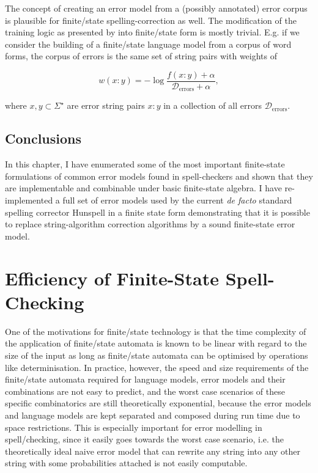 \documentclass[officiallayout,final]{unihelcompling}
\begin{document}
The concept of creating an error model from a (possibly annotated) error corpus
is plausible for finite\-/state spelling-correction as well. The modification
of the training logic as presented by \citet{church1991probability} into
finite\-/state form is mostly trivial. E.g. if we consider the building of a
finite\-/state language model from a corpus of word forms, the corpus of errors
is the same set of string pairs with weights of 

\begin{equation}
    w(x:y) = -\log\frac{f(x:y) + \alpha}{\mathcal{D}_\mathrm{errors} + \alpha},
\end{equation}

where $x, y \subset \Sigma^\star$ are error string pairs $x:y$ in a collection
of all errors $\mathcal{D}_\mathrm{errors}$.

\section{Conclusions}

In this chapter, I have enumerated some of the most important finite-state
formulations of common error models found in spell-checkers and shown that they
are implementable and combinable under basic finite-state algebra. I have
re-implemented a full set of error models used by the current \emph{de facto}
standard spelling corrector Hunspell in a finite state form demonstrating that
it is possible to replace string-algorithm correction algorithms by a sound
finite-state error model.

\chapter{Efficiency of Finite-State Spell-Checking}
\label{chap:efficiency}

One of the motivations for finite\-/state technology is that the time
complexity of the application of finite\-/state automata is known to be linear
with regard to the size of the input as long as finite\-/state automata can be
optimised by operations like determinisation. In practice, however, the speed
and size requirements of the finite\-/state automata required for language
models, error models and their combinations are not easy to predict, and the
worst case scenarios of these specific combinatorics are still theoretically
exponential, because the error models and language models are kept separated
and composed during run time due to space restrictions. This is especially
important for error modelling in spell\-/checking, since it easily goes towards
the worst case scenario, i.e. the theoretically ideal naive error model that
can rewrite any string into any other string with some probabilities attached
is not easily computable.
\end{document}
